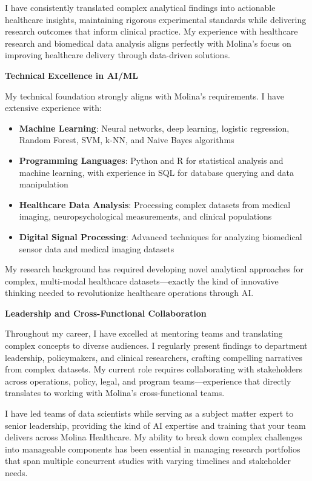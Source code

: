 \documentclass[10.5pt, letterpaper]{russell}
\begin{document}
\begin{cvletter}
  I have consistently translated complex analytical findings into actionable healthcare insights, maintaining rigorous experimental standards while delivering research outcomes that inform clinical practice. My experience with healthcare research and biomedical data analysis aligns perfectly with Molina's focus on improving healthcare delivery through data-driven solutions.

  \textbf{Technical Excellence in AI/ML}

  My technical foundation strongly aligns with Molina's requirements. I have extensive experience with:

  \begin{itemize}
    \item \textbf{Machine Learning}: Neural networks, deep learning, logistic regression, Random Forest, SVM, k-NN, and Naive Bayes algorithms
    \item \textbf{Programming Languages}: Python and R for statistical analysis and machine learning, with experience in SQL for database querying and data manipulation
    \item \textbf{Healthcare Data Analysis}: Processing complex datasets from medical imaging, neuropsychological measurements, and clinical populations
    \item \textbf{Digital Signal Processing}: Advanced techniques for analyzing biomedical sensor data and medical imaging datasets
  \end{itemize}

  My research background has required developing novel analytical approaches for complex, multi-modal healthcare datasets—exactly the kind of innovative thinking needed to revolutionize healthcare operations through AI.

  \textbf{Leadership and Cross-Functional Collaboration}

  Throughout my career, I have excelled at mentoring teams and translating complex concepts to diverse audiences. I regularly present findings to department leadership, policymakers, and clinical researchers, crafting compelling narratives from complex datasets. My current role requires collaborating with stakeholders across operations, policy, legal, and program teams—experience that directly translates to working with Molina's cross-functional teams.

  I have led teams of data scientists while serving as a subject matter expert to senior leadership, providing the kind of AI expertise and training that your team delivers across Molina Healthcare. My ability to break down complex challenges into manageable components has been essential in managing research portfolios that span multiple concurrent studies with varying timelines and stakeholder needs.


\end{cvletter}
\end{document}
